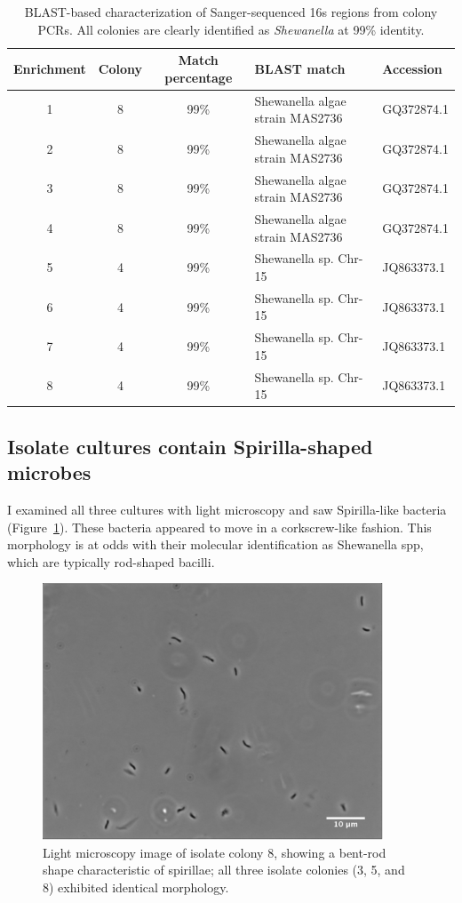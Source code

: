 \documentclass{article}
\begin{document}
\begin{table}
\centering
\begin{tabular}{|c|c|c|l|l|}
\hline
Enrichment & Colony & Match percentage & BLAST match & Accession \\
\hline
1 &
8 &
99\% &
Shewanella algae strain MAS2736 &
GQ372874.1 \\

2 &
8 &
99\% &
Shewanella algae strain MAS2736 &
GQ372874.1 \\

3 &
8 &
99\% &
Shewanella algae strain MAS2736 &
GQ372874.1 \\

4 &
8 &
99\% &
Shewanella algae strain MAS2736 &
GQ372874.1 \\

5 &
4 &
99\% &
Shewanella sp. Chr-15 &
JQ863373.1 \\

6 &
4 &
99\% &
Shewanella sp. Chr-15 &
JQ863373.1 \\

7 &
4 &
99\% &
Shewanella sp. Chr-15 &
JQ863373.1 \\

8 &
4 &
99\% &
Shewanella sp. Chr-15 &
JQ863373.1 \\
\hline
\end{tabular}
\caption{BLAST-based characterization of Sanger-sequenced 16s regions from colony PCRs.  All colonies are clearly identified as {\em Shewanella} at 99\% identity.}
\label{tab:16s}
\end{table}

\subsection*{Isolate cultures contain Spirilla-shaped microbes}

I examined all three cultures with light microscopy and saw
Spirilla-like bacteria (Figure~\ref{fig:spirilla}).  These bacteria
appeared to move in a corkscrew-like fashion.  This morphology is at
odds with their molecular identification as Shewanella spp, which are
typically rod-shaped bacilli.

\begin{figure}[!ht]
  \centerline{\includegraphics[width=4in]{spirilla.png}}
  \caption{Light microscopy image of isolate colony 8, showing a
    bent-rod shape characteristic of spirillae; all three isolate
    colonies (3, 5, and 8) exhibited identical morphology.}
  \label{fig:spirilla}
\end{figure}
\end{document}
